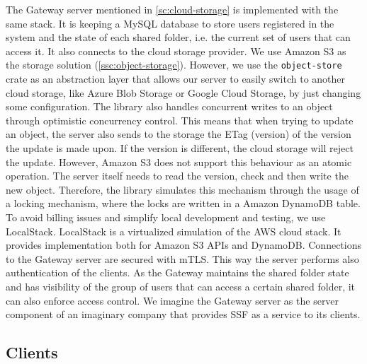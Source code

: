 The Gateway server mentioned in \cref{sc:cloud-storage}
is implemented with the same stack. It is keeping
a MySQL database to store users registered in the system and
the state of each shared folder, i.e. the current set of users
that can access it. 
It also connects to the cloud storage provider. 
We use Amazon S3 as the storage solution (\cref{ssc:object-storage}).
However, we use the \texttt{object-store} crate as an abstraction layer
that allows our server to easily switch to another cloud storage,
like Azure Blob Storage or Google Cloud Storage, by just changing
some configuration. The library also handles concurrent writes
to an object through optimistic concurrency control.
This means that when trying to update an object,
the server also sends to the storage the ETag (version)
of the version the update is made upon.
If the version is different, the cloud storage will reject the update.
However, Amazon S3 does not support this behaviour as an atomic operation. 
The server itself needs to read the version,
check and then write the new object.
Therefore, the library simulates this mechanism through the usage
of a locking mechanism, where the locks are written in a
Amazon DynamoDB table.
To avoid billing issues and simplify local development and testing,
we use LocalStack. LocalStack is a virtualized simulation
of the AWS cloud stack. It provides implementation both for Amazon S3
APIs and DynamoDB.
Connections to the Gateway server are secured with mTLS.
This way the server performs also authentication of the clients.
As the Gateway maintains the shared folder state and has visibility
of the group of users that can access a certain shared folder, 
it can also enforce access control.
We imagine the Gateway server as the server component of an
imaginary company that provides SSF as a service to its clients.


\subsection{Clients}\label{scc:clients}

